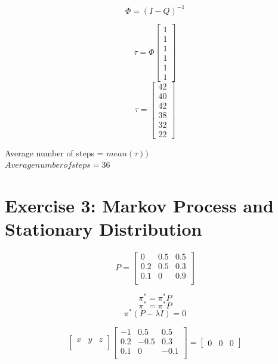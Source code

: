 \documentclass[unicode,11pt,a4paper,oneside,numbers=endperiod,openany]{scrartcl}
\begin{document}
      \[ \Phi = (I - Q)^{-1}
   \]
   
   
   \[ \tau = \Phi
        \begin{bmatrix}
                1\\
                1\\
                1\\
                1\\
                1\\
                1
        \end{bmatrix}
   \]
   \[ \tau =
        \begin{bmatrix}
                42\\
                40\\
                42\\
                38\\
                32\\
                22
        \end{bmatrix}
   \]
   
   
   {Average number of steps = $mean(\tau))$}\\
   \Rightarrow ${Average number of steps = 36}$







\section*{Exercise 3: Markov Process and Stationary Distribution}

    \[
		P = \begin{bmatrix}
                0 & 0.5 & 0.5\\
                0.2 & 0.5 & 0.3\\
                0.1 & 0 & 0.9\\
              \end{bmatrix}
    \]
    
    \[
		\pi^* = \pi^* P
    \]
    \[
		\pi^* = \pi^* P
    \]
    \[
		\pi^*(P - \lambda I) = 0
    \]
    
    \[
		\begin{bmatrix}
                x & y & z\\
        \end{bmatrix}
        \begin{bmatrix}
        -1 & 0.5 & 0.5\\
        0.2 & -0.5 & 0.3\\
        0.1 & 0 & -0.1\\
        \end{bmatrix}
        =
        \begin{bmatrix}
        0 & 0 & 0
        \end{bmatrix}
    \]
    
\end{document}
